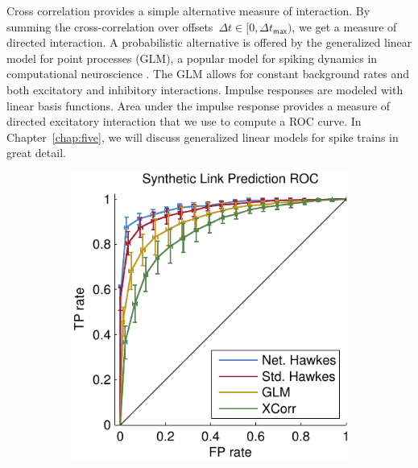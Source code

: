 Cross correlation provides a simple alternative measure of
interaction. By summing the cross-correlation over offsets~${\Delta
  t\in[0,\Delta t_{\mathsf{max}})}$, we get a measure of directed
  interaction. A probabilistic alternative is offered by the
  generalized linear model for point processes (GLM), a popular model
  for spiking dynamics in computational neuroscience
  \citep{Paninski-2004}. The GLM allows for constant background rates
  and both excitatory and inhibitory interactions. Impulse responses
  are modeled with linear basis functions. Area under the impulse
  response provides a measure of directed excitatory interaction that
  we use to compute a ROC curve. In Chapter~\ref{chap:five}, we will
  discuss generalized linear models for spike trains in great detail.
\begin{figure}[t]
  \begin{center}
  \begin{subfigure}[T]{.4\textwidth}
    \caption{}
    \includegraphics[width=\textwidth]{figures/ch3/synth_link_pred} 
    \label{fig:synth_link_pred}
  \end{subfigure}
  ~ ~ ~ ~
  \begin{subfigure}[T]{.4\textwidth}
    \caption{}

\end{subfigure}
\end{center}
\end{figure}
